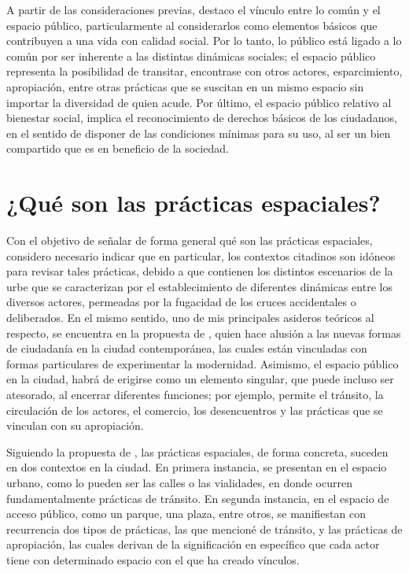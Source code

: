 \documentclass[
  spanish,
  11pt,
  a4paper,
]{scrbook}
\begin{document}
A partir de las consideraciones previas, destaco el vínculo entre lo
común y el espacio público, particularmente al considerarlos como
elementos básicos que contribuyen a una vida con calidad social. Por lo
tanto, lo público está ligado a lo común por ser inherente a las
distintas dinámicas sociales; el espacio público representa la
posibilidad de transitar, encontrase con otros actores, esparcimiento,
apropiación, entre otras prácticas que se suscitan en un mismo espacio
sin importar la diversidad de quien acude. Por último, el espacio
público relativo al bienestar social, implica el reconocimiento de
derechos básicos de los ciudadanos, en el sentido de disponer de las
condiciones mínimas para su uso, al ser un bien compartido que es en
beneficio de la sociedad.

\section*{¿Qué son las prácticas
espaciales?}\label{quuxe9-son-las-pruxe1cticas-espaciales}


Con el objetivo de señalar de forma general qué son las prácticas
espaciales, considero necesario indicar que en particular, los contextos
citadinos son idóneos para revisar tales prácticas, debido a que
contienen los distintos escenarios de la urbe que se caracterizan por el
establecimiento de diferentes dinámicas entre los diversos actores,
permeadas por la fugacidad de los cruces accidentales o deliberados. En
el mismo sentido, uno de mis principales asideros teóricos al respecto,
se encuentra en la propuesta de \textcite{Moreno2023}, quien hace
alusión a las nuevas formas de ciudadanía en la ciudad contemporánea,
las cuales están vinculadas con formas particulares de experimentar la
modernidad. Asimismo, el espacio público en la ciudad, habrá de erigirse
como un elemento singular, que puede incluso ser atesorado, al encerrar
diferentes funciones; por ejemplo, permite el tránsito, la circulación
de los actores, el comercio, los desencuentros y las prácticas que se
vinculan con su apropiación.

Siguiendo la propuesta de \textcite{Moreno2023}, las prácticas
espaciales, de forma concreta, suceden en dos contextos en la ciudad. En
primera instancia, se presentan en el espacio urbano, como lo pueden ser
las calles o las vialidades, en donde ocurren fundamentalmente prácticas
de tránsito. En segunda instancia, en el espacio de acceso público, como
un parque, una plaza, entre otros, se manifiestan con recurrencia dos
tipos de prácticas, las que mencioné de tránsito, y las prácticas de
apropiación, las cuales derivan de la significación en específico que
cada actor tiene con determinado espacio con el que ha creado vínculos.
\end{document}

